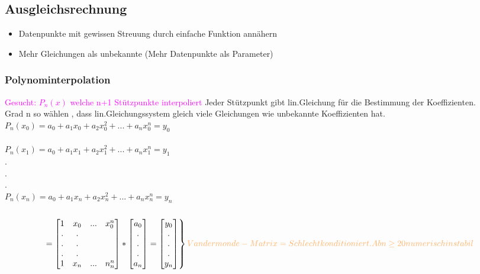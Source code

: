 \documentclass[../ZF_HM2.tex]{subfiles}
\begin{document}

\subsection{Ausgleichsrechnung}
\begin{itemize}
	\item Datenpunkte mit gewissen Streuung durch einfache Funktion annähern
	\item Mehr Gleichungen als unbekannte (Mehr Datenpunkte als Parameter)

\end{itemize}

\subsubsection{Polynominterpolation}
\textcolor {magenta} {Gesucht: $P_n(x)$ welche n+1 Stützpunkte interpoliert}
Jeder Stützpunkt gibt lin.Gleichung für die \colorbox {orange!30}{Bestimmung der Koeffizienten.}\\
\colorbox {green!30}{Grad n} so wählen , dass lin.Gleichungssystem gleich viele Gleichungen wie unbekannte Koeffizienten hat.\\
$P_n(x_0) = a_0 + a_1x_0 + a_2x_0^{2} + ... + a_nx_0^{n}=y_0$\\\\
$P_n(x_1) = a_0 + a_1x_1 + a_2x_1^{2} + ... + a_nx_1^{n}=y_1$\\
		.\\
		.\\
		.\\
$P_n(x_n) = a_0 + a_1x_n + a_2x_n^{2} + ... + a_nx_n^{n}=y_n$\\\\


\[
\begin{rcases*}
 = \left[\begin {matrix}1 & x_0 & ... & x_0^{n}\\
.&.\\
.&.\\
.&.\\
1 & x_n &...& n_n^{n}\end{matrix}\right] *
 \left[\begin {matrix}a_0\\
.\\
.\\
.\\
a_n\end{matrix}\right]
= \left[\begin {matrix}y_0\\
.\\
.\\
.\\
y_n\end{matrix}\right] 
\end{rcases*}\textcolor {orange!60}{Van der monde-Matrix = Schlecht konditioniert.
Ab n \geq 20 numerisch instabil}
\]
\end{document}

